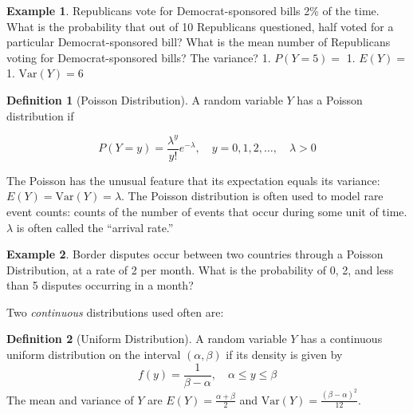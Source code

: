 \documentclass[
]{book}
\theoremstyle{definition}
\newtheorem{definition}{Definition}[chapter]
\theoremstyle{definition}
\newtheorem{example}{Example}[chapter]
\theoremstyle{definition}
\theoremstyle{remark}
\begin{document}
\begin{example}
\protect\hypertarget{exm:unnamed-chunk-88}{}{\label{exm:unnamed-chunk-88} }Republicans vote for Democrat-sponsored bills 2\% of the time. What is the probability that out of 10 Republicans questioned, half voted for a particular Democrat-sponsored bill? What is the mean number of Republicans voting for Democrat-sponsored bills? The variance?
1. \(P(Y=5)=\)
1. \(E(Y)=\)
1. \(\text{Var}(Y)=6\)
\end{example}

\begin{definition}[Poisson Distribution]
\protect\hypertarget{def:unnamed-chunk-89}{}{\label{def:unnamed-chunk-89} {} }A random variable \(Y\) has a Poisson distribution if

\[P(Y = y)=\frac{\lambda^y}{y!}e^{-\lambda}, \quad y=0,1,2,\ldots, \quad \lambda>0\]

The Poisson has the unusual feature that its expectation equals its variance: \(E(Y)=\text{Var}(Y)=\lambda\). The Poisson distribution is often used to model rare event counts: counts of the number of events that occur during some unit of time. \(\lambda\) is often called the ``arrival rate.''
\end{definition}

\begin{example}
\protect\hypertarget{exm:unnamed-chunk-90}{}{\label{exm:unnamed-chunk-90} }Border disputes occur between two countries through a Poisson Distribution, at a rate of 2 per month. What is the probability of 0, 2, and less than 5 disputes occurring in a month?
\end{example}

Two \emph{continuous} distributions used often are:

\begin{definition}[Uniform Distribution]
\protect\hypertarget{def:unnamed-chunk-91}{}{\label{def:unnamed-chunk-91} {} }A random variable \(Y\) has a continuous uniform distribution on the interval \((\alpha,\beta)\) if its density is given by \[f(y)=\frac{1}{\beta-\alpha}, \quad \alpha\le y\le \beta\] The mean and variance of \(Y\) are \(E(Y)=\frac{\alpha+\beta}{2}\) and \(\text{Var}(Y)=\frac{(\beta-\alpha)^2}{12}\).
\end{definition}
\end{document}
